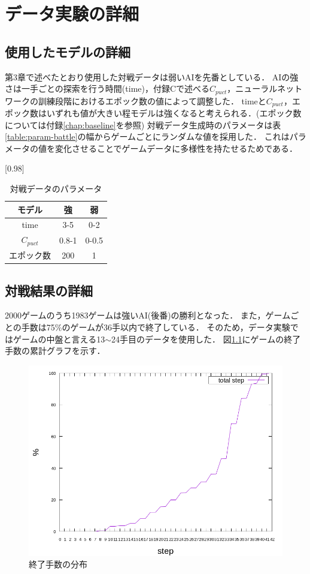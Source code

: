 \chapter{データ実験の詳細}
\label{chap:data}
\section{使用したモデルの詳細}
第3章で述べたとおり使用した対戦データは弱いAIを先番としている．
AIの強さは一手ごとの探索を行う時間(time)，付録Cで述べる$C_{puct}$，ニューラルネットワークの訓練段階におけるエポック数の値によって調整した．
timeと$C_{puct}$，エポック数はいずれも値が大きい程モデルは強くなると考えられる．(エポック数については付録\ref{chap:baseline}を参照)
対戦データ生成時のパラメータは表\ref{table:param-battle}の幅からゲームごとにランダムな値を採用した．
これはパラメータの値を変化させることでゲームデータに多様性を持たせるためである．
\begin{table}[H]
	\caption{対戦データのパラメータ}
	\label{table:param-battle}
	\centering
	\scalebox{0.98}[0.98]{
		\begin{tabular}{c|c|c}
			モデル&強&弱\\ \hline
			time    & 3-5 & 0-2 \\ 
			$C_{puct}$ & 0.8-1   & 0-0.5 \\
			エポック数 & 200 & 1 \\

		\end{tabular}
	}
	\label{table:battle}
\end{table}

\section{対戦結果の詳細}
2000ゲームのうち1983ゲームは強いAI(後番)の勝利となった．
また，ゲームごとの手数は75\%のゲームが36手以内で終了している．
そのため，データ実験ではゲームの中盤と言える13$\sim$24手目のデータを使用した．
図\ref{fig:stepCum}にゲームの終了手数の累計グラフを示す．
\begin{figure}[htbp]
	\centering
	\includegraphics[width=\linewidth]{./figure/stepCum.png}
	\caption{終了手数の分布}
	\label{fig:stepCum}
\end{figure}




